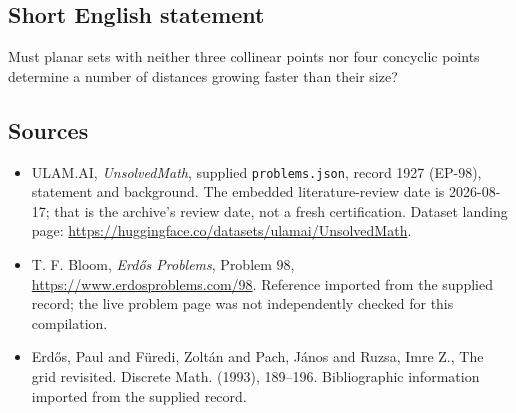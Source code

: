 \documentclass[11pt,a4paper]{article}
\begin{document}
\subsection{Short English statement}

Must planar sets with neither three collinear points nor four concyclic points determine a number of distances growing faster than their size?

\subsection{Sources}

{\small

\begin{itemize}

\item[\hypertarget{source:1927:1}{S1}] ULAM.AI, \emph{UnsolvedMath}, supplied \texttt{problems.json}, record 1927 (EP-98), statement and background. The embedded literature-review date is 2026-08-17; that is the archive’s review date, not a fresh certification. Dataset landing page: \url{https://huggingface.co/datasets/ulamai/UnsolvedMath}.

\item[\hypertarget{source:1927:2}{S2}] T. F. Bloom, \emph{Erdős Problems}, Problem 98, \url{https://www.erdosproblems.com/98}. Reference imported from the supplied record; the live problem page was not independently checked for this compilation.

\item[\hypertarget{source:1927:3}{S3}] Erd\H{o}s, Paul and F\"{u}redi, Zolt\'{a}n and Pach, J\'{a}nos and Ruzsa, Imre Z., The grid revisited. Discrete Math. (1993), 189--196. Bibliographic information imported from the supplied record.

\end{itemize}

}

\label{end:1927}
\end{document}
